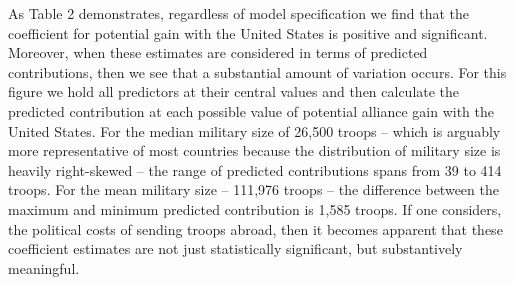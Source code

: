 \documentclass[12pt,letterpaper]{article}
\begin{document}
	

	

	As Table 2 demonstrates, regardless of model specification we find that the coefficient for potential gain with the United States is positive and significant. Moreover, when these estimates are considered in terms of predicted contributions, then we see that a substantial amount of variation occurs. For this figure we hold all predictors at their central values and then calculate the predicted contribution at each possible value of potential alliance gain with the United States. For the median military size of 26,500 troops -- which is arguably more representative of most countries because the distribution of military size is heavily right-skewed -- the range of predicted contributions spans from 39 to 414 troops. For the mean military size -- 111,976 troops -- the difference between the maximum and minimum predicted contribution is 1,585 troops. If one considers, the political costs of sending troops abroad, then it becomes apparent that these coefficient estimates are not just statistically significant, but substantively meaningful.
	
\end{document}
